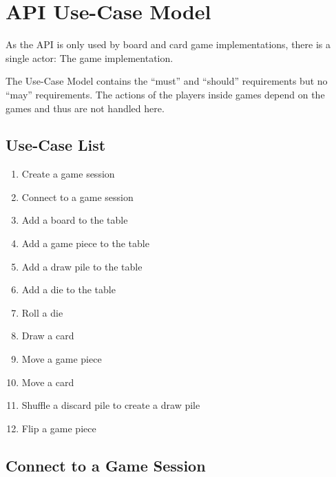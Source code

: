 \section{API Use-Case Model}

As the API is only used by board and card game implementations, there is a
single actor: The game implementation.

The Use-Case Model contains the “must” and “should” requirements but no “may”
requirements. The actions of the players inside games depend on the games and
thus are not handled here.

\subsection{Use-Case List}

\begin{enumerate}
  \item Create a game session
  \item Connect to a game session
  \item Add a board to the table
  \item Add a game piece to the table
  \item Add a \gls{draw pile} to the table
  \item Add a \gls{die} to the table
  \item Roll a \gls{die}
  \item Draw a card
  \item Move a game piece
  \item Move a card
  \item Shuffle a \gls{discard pile} to create a \gls{draw pile}
  \item Flip a game piece
\end{enumerate}

\subsection{Connect to a Game Session}

